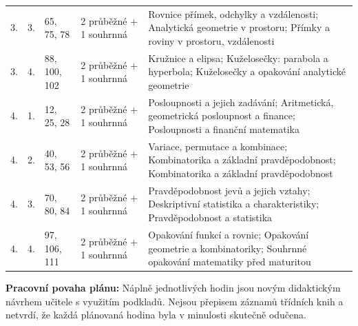 \documentclass[10pt,a4paper]{article}
\begin{document}
\begin{longtable}{@{}p{17mm}p{12mm}p{27mm}p{26mm}p{72mm}@{}}
3. & 3. & 65, 75, 78 & 2 průběžné + 1 souhrnná & Rovnice přímek, odchylky a vzdálenosti; Analytická geometrie v prostoru; Přímky a roviny v prostoru, vzdálenosti \\
3. & 4. & 88, 100, 102 & 2 průběžné + 1 souhrnná & Kružnice a elipsa; Kuželosečky: parabola a hyperbola; Kuželosečky a opakování analytické geometrie \\
4. & 1. & 12, 25, 28 & 2 průběžné + 1 souhrnná & Posloupnosti a jejich zadávání; Aritmetická, geometrická posloupnost a finance; Posloupnosti a finanční matematika \\
4. & 2. & 40, 53, 56 & 2 průběžné + 1 souhrnná & Variace, permutace a kombinace; Kombinatorika a základní pravděpodobnost; Kombinatorika a základní pravděpodobnost \\
4. & 3. & 70, 80, 84 & 2 průběžné + 1 souhrnná & Pravděpodobnost jevů a jejich vztahy; Deskriptivní statistika a charakteristiky; Pravděpodobnost a statistika \\
4. & 4. & 97, 106, 111 & 2 průběžné + 1 souhrnná & Opakování funkcí a rovnic; Opakování geometrie a kombinatoriky; Souhrnné opakování matematiky před maturitou \\
\end{longtable}
\normalsize
\textbf{Pracovní povaha plánu:} Náplně jednotlivých hodin jsou novým didaktickým návrhem učitele s využitím podkladů. Nejsou přepisem záznamů třídních knih a netvrdí, že každá plánovaná hodina byla v minulosti skutečně odučena.
\end{document}
